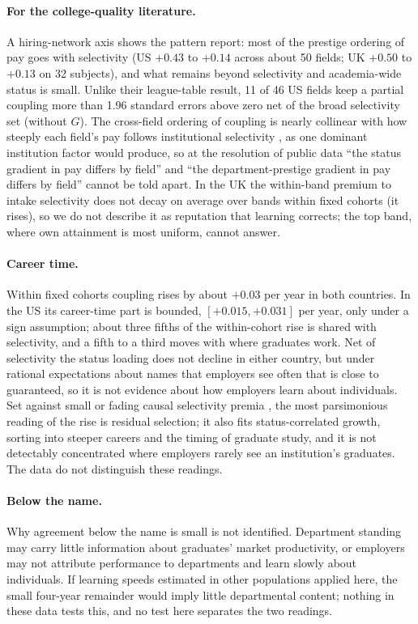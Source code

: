 \documentclass[11pt]{article}
\begin{document}
\paragraph{For the college-quality literature.} A hiring-network axis shows the pattern \citet{britton2022how}
report: most of the prestige ordering of pay goes with selectivity (US $+0.43$ to $+0.14$ across about 50 fields;
UK $+0.50$ to $+0.13$ on 32 subjects), and what remains beyond selectivity and academia-wide status is small.
Unlike their league-table result, 11 of 46 US fields keep a partial coupling more than 1.96 standard errors above
zero net of the broad selectivity set (without $G$). The cross-field ordering of coupling is nearly collinear with how steeply each
field's pay follows institutional selectivity \citep{bloem2024understanding}, as one dominant institution factor
would produce, so at the resolution of public data ``the status gradient in pay differs by field'' and ``the
department-prestige gradient in pay differs by field'' cannot be told apart. In the UK the within-band premium to
intake selectivity does not decay on average over bands within fixed cohorts (it rises), so we do not describe it
as reputation that learning corrects; the top band, where own attainment is most uniform, cannot answer.

\paragraph{Career time.} Within fixed cohorts coupling rises by about $+0.03$ per year in both countries. In the
US its career-time part is bounded, $[+0.015, +0.031]$ per year, only under a sign assumption; about three fifths
of the within-cohort rise is shared with selectivity, and a fifth to a third moves with where graduates work. Net
of selectivity the status loading does not decline in either country, but under rational expectations about names that employers see often that is close to guaranteed, so it is not
evidence about how employers learn about individuals. Set against small or fading causal selectivity premia \citep{dale2014estimating, mountjoy2021returns},
the most parsimonious reading of the rise is residual selection; it also fits status-correlated growth, sorting
into steeper careers and the timing of graduate study, and it is not detectably concentrated where employers
rarely see an institution's graduates. The data do not distinguish these readings.

\paragraph{Below the name.} Why agreement below the name is small is not identified. Department standing may carry
little information about graduates' market productivity, or employers may not attribute performance to
departments and learn slowly about individuals. If learning speeds estimated in other populations
\citep{lange2007speed, arcidiacono2010beyond} applied here, the small four-year remainder would imply little
departmental content; nothing in these data tests this, and no test here separates the two readings.
\end{document}
